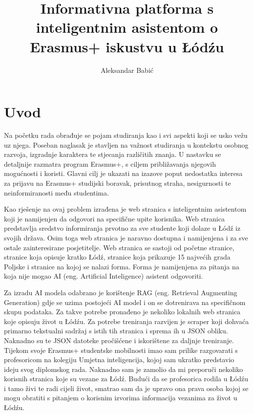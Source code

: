 \documentclass[]{foi}
\title{Informativna platforma s inteligentnim asistentom o Erasmus+ iskustvu u \L\'{o}d\'{z}u}
\author{Aleksandar Babić}
\begin{document}
\maketitle

\tableofcontents

\makeatletter {} \makeatother
\pagestyle{plain}



\chapter{Uvod}

Na početku rada obrađuje se pojam studiranja kao i svi aspekti koji se usko vežu uz njega. Poseban naglasak je stavljen na važnost studiranja u kontekstu osobnog razvoja, izgradnje karaktera
te stjecanja različitih znanja. U nastavku se detaljnije razmatra program Erasmus+, s ciljem približavanja njegovih mogućnosti i koristi. Glavni cilj je ukazati na izazove poput nedostatka interesa
za prijavu na Erasmus+ studijski boravak, prisutnog straha, nesigurnosti te neinformiranosti među studentima. 

Kao rješenje na ovaj problem izrađena je web stranica s inteligentnim asistentom koji je namijenjen da odgovori na specifične upite korisnika. Web stranica predstavlja sredstvo informiranja 
prvotno za sve studente koji dolaze u Łódź iz svojih država. Osim toga web stranica je naravno dostupna i namijenjena i za sve ostale zainteresirane posjetitelje. Web stranica se sastoji od 
početne stranice, stranice koja opisuje kratko Łódź, stranice koja prikazuje 15 najvećih grada Poljske i stranice na kojoj se nalazi forma. Forma je namijenjena za pitanja na koja nije mogao 
AI (eng. Artificial Inteligence) asistent odgovoriti. 

Za izradu AI modela odabrano je korištenje RAG (eng. Retrieval Augmenting Generation) gdje se uzima postojeći AI model i on se dotrenirava na specifičnom skupu podataka. 
Za takve potrebe pronađeno je nekoliko lokalnih web stranica koje opisuju život u Łódźu. Za potrebe treniranja razvijen je scraper koji dohvaća primarno tekstualni sadržaj s istih tih stranica
i sprema ih u JSON obliku. Naknadno su te JSON datoteke pročišćene i iskorištene za daljnje treniranje. Tijekom svoje Erasmus+ studentske mobilnosti imao sam prilike razgovarati s profesoricom na 
kolegiju Umjetna inteligencija, kojoj sam ukratko predstavio ideju svog diplomskog rada. Naknadno sam je zamolio da mi preporuči nekoliko korisnih stranica koje su vezane za Łódź. Budući da se profesorica rodila u Łódźu i tamo živi te radi cijeli život, smatrao sam da je upravo ona prava osoba kojoj se mogu obratiti
s pitanjem o korisnim izvorima informacija vezanima za život u Łódźu. 
\end{document}
